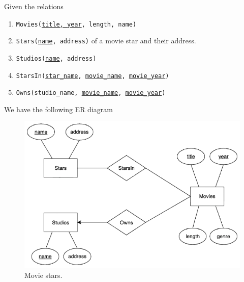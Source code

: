    \begin{example}
      Given the relations 
      \begin{enumerate}
        \item \texttt{Movies(\underline{title, year}, length, name)}
        \item \texttt{Stars(\underline{name}, address)} of a movie star and their address. 
        \item \texttt{Studios(\underline{name}, address)} 
        \item \texttt{StarsIn(\underline{star\_name}, \underline{movie\_name}, \underline{movie\_year})} 
        \item \texttt{Owns(studio\_name, \underline{movie\_name}, \underline{movie\_year})}
      \end{enumerate}
      We have the following ER diagram 
      \begin{figure}[H]
        \centering 
        \includegraphics[scale=0.3]{img/movie_stars.png}
        \caption{Movie stars. } 
        \label{fig:movie_stars}
      \end{figure}
    \end{example}

